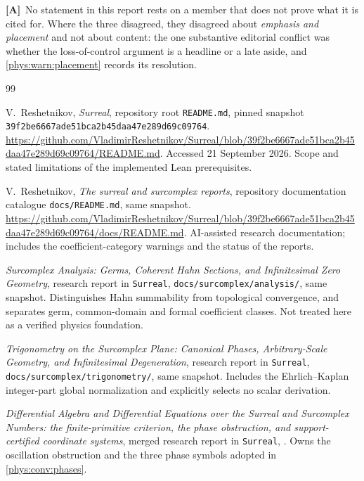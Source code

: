\documentclass[11pt,letterpaper]{article}
\numberwithin{equation}{section}
\theoremstyle{definition}
\theoremstyle{remark}
\newcommand{\Commit}{\nolinkurl{39f2be6667ade51bca2b45daa47e289d69c09764}}
\newcommand{\TA}{\textcolor{TierA}{\textsf{\bfseries[A]}}}
\begin{document}
\TA\ No statement in this report rests on a member that does not prove what it
is cited for. Where the three disagreed, they disagreed about \emph{emphasis
and placement} and not about content: the one substantive editorial conflict
was whether the loss-of-control argument is a headline or a late aside, and
\cref{phys:warn:placement} records its resolution.
\clearpage
{}
{}
\begingroup
\raggedright
\begin{thebibliography}{99}
\small
\setlength{\itemsep}{0.35em}

V.~Reshetnikov, \emph{Surreal}, repository root \texttt{README.md}, pinned
snapshot \Commit.
\url{https://github.com/VladimirReshetnikov/Surreal/blob/39f2be6667ade51bca2b45daa47e289d69c09764/README.md}.
Accessed 21 September 2026. Scope and stated limitations of the implemented
Lean prerequisites.

V.~Reshetnikov, \emph{The surreal and surcomplex reports}, repository
documentation catalogue \texttt{docs/README.md}, same snapshot.
\url{https://github.com/VladimirReshetnikov/Surreal/blob/39f2be6667ade51bca2b45daa47e289d69c09764/docs/README.md}.
AI-assisted research documentation; includes the coefficient-category warnings
and the status of the reports.

\emph{Surcomplex Analysis: Germs, Coherent Hahn Sections, and Infinitesimal
Zero Geometry}, research report in \texttt{Surreal},
\texttt{docs/surcomplex/analysis/}, same snapshot. Distinguishes Hahn
summability from topological convergence, and separates germ, common-domain
and formal coefficient classes. Not treated here as a verified physics
foundation.

\emph{Trigonometry on the Surcomplex Plane: Canonical Phases, Arbitrary-Scale
Geometry, and Infinitesimal Degeneration}, research report in \texttt{Surreal},
\texttt{docs/surcomplex/trigonometry/}, same snapshot. Includes the
Ehrlich--Kaplan integer-part global normalization and explicitly selects no
scalar derivation.

\emph{Differential Algebra and Differential Equations over the Surreal and
Surcomplex Numbers: the finite-primitive criterion, the phase obstruction, and
support-certified coordinate systems}, merged research report in
\texttt{Surreal}, . Owns the
oscillation obstruction and the three phase symbols adopted in
\cref{phys:conv:phases}.


\end{thebibliography}
\end{document}
